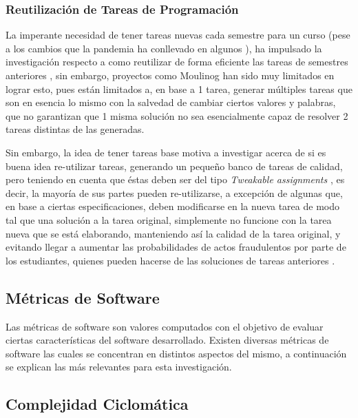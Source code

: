 \documentclass[letterpaper,12pt]{article}
\begin{document}
\subsubsection{Reutilización de Tareas de Programación}

La imperante necesidad de tener tareas nuevas cada semestre para un curso (pese a los cambios que la pandemia ha conllevado en algunos \cite{10.1145/3456565.3461439}), ha impulsado la investigación respecto a como reutilizar de forma eficiente las tareas de semestres anteriores \cite{10.1145/3477429}, sin embargo, proyectos como Moulinog \cite{10.1145/3414080.3414100} han sido muy limitados en lograr esto, pues están limitados a, en base a 1 tarea, generar múltiples tareas que son en esencia lo mismo con la salvedad de cambiar ciertos valores y palabras, que no garantizan que 1 misma solución no sea esencialmente capaz de resolver 2 tareas distintas de las generadas.

Sin embargo, la idea de tener tareas base motiva a investigar acerca de si es buena idea re-utilizar tareas, generando un pequeño banco de tareas de calidad, pero teniendo en cuenta que éstas deben ser del tipo \textit{Tweakable assignments} \cite{10.1145/3477429}, es decir, la mayoría de sus partes pueden re-utilizarse, a excepción de algunas que, en base a ciertas especificaciones, deben modificarse en la nueva tarea de modo tal que una solución a la tarea original, simplemente no funcione con la tarea nueva que se está elaborando, manteniendo así la calidad de la tarea original, y evitando llegar a aumentar las probabilidades de actos fraudulentos por parte de los estudiantes, quienes pueden hacerse de las soluciones de tareas anteriores \cite{10.1145/3013499.3013507}.

\subsection{Métricas de Software}

Las métricas de software son valores computados con el objetivo de evaluar ciertas características del software desarrollado\cite{1702275}. Existen diversas métricas de software las cuales se concentran en distintos aspectos del mismo, a continuación se explican las más relevantes para esta investigación.

\subsection{Complejidad Ciclomática}
\end{document}
